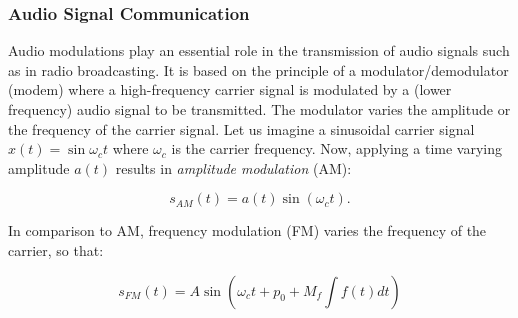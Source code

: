 \subsubsection*{Audio Signal Communication}

Audio modulations play an essential role in the transmission of audio signals such as in radio broadcasting.
It is based on the principle of a modulator/demodulator (modem) where a high-frequency carrier signal is modulated by a (lower frequency) audio signal to be transmitted.
The modulator varies the amplitude or the frequency of the carrier signal.
Let us imagine a sinusoidal carrier signal $x(t) = \sin \omega_c t$ where $\omega_c$ is the carrier frequency. Now, applying a time varying amplitude $a(t)$ results in \emph{amplitude modulation} (AM):


\begin{equation*}
    s_{AM}(t) = a(t) \sin \left( \omega_{c} t\right).    
\end{equation*}

\vspace{1cm}

In comparison to AM, frequency modulation (FM) varies the frequency of the carrier, so that:

\begin{equation*}
    s_{FM}(t) = A \sin \left( \omega_{c} t + p_0 + M_f \int f(t) dt \right)
\end{equation*}

